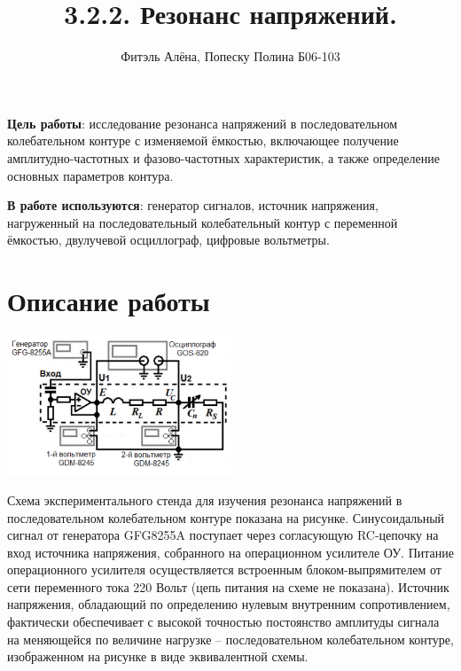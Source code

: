 \documentclass[a4paper,12pt]{article}
\author{Фитэль Алёна, Попеску Полина Б06-103}
\title{3.2.2. Резонанс напряжений.}
\begin{document}
\maketitle
\newpage
\textbf{Цель работы}: исследование резонанса напряжений в последовательном колебательном контуре с изменяемой ёмкостью, включающее получение амплитудно-частотных и фазово-частотных характеристик, а также определение основных параметров контура.


\textbf{В работе используются}: генератор сигналов, источник напряжения, нагруженный на последовательный колебательный контур с переменной ёмкостью, двулучевой осциллограф, цифровые вольтметры.
\section{Описание работы}
\begin{center}
\includegraphics[width = 0.5\textwidth]{2.png}
\end{center}
Схема экспериментального стенда для изучения резонанса напряжений в последовательном колебательном контуре показана на рисунке. Синусоидальный сигнал от генератора GFG8255A поступает через согласующую RC-цепочку на вход источника напряжения, собранного на операционном усилителе ОУ. Питание операционного усилителя осуществляется
встроенным блоком-выпрямителем от сети переменного тока 220 Вольт (цепь питания на
схеме не показана). Источник напряжения, обладающий по определению нулевым внутренним сопротивлением, фактически обеспечивает с высокой точностью постоянство амплитуды сигнала на меняющейся по величине нагрузке – последовательном колебательном контуре, изображенном на рисунке в виде эквивалентной схемы.
\end{document}
